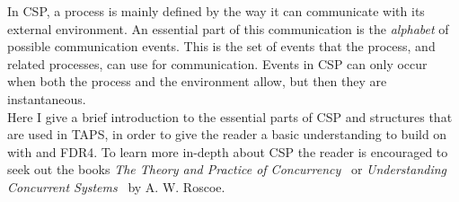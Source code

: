 In CSP, a process is mainly defined by the way it can communicate with its external environment. An essential part of this communication is the \textit{alphabet} of possible communication events. This is the set of events that the process, and related processes, can use for communication. Events in CSP can only occur when both the process and the environment allow, but then they are instantaneous.\\

Here I give a brief introduction to the essential parts of CSP and structures that are used in TAPS, in order to give the reader a basic understanding to build on with \cspm{} and FDR4. To learn more in-depth about CSP the reader is encouraged to seek out the books \textit{The Theory and Practice of Concurrency}~\cite{Roscoe1997} or \textit{Understanding Concurrent Systems}~\cite{Roscoe2010} by A. W. Roscoe.
